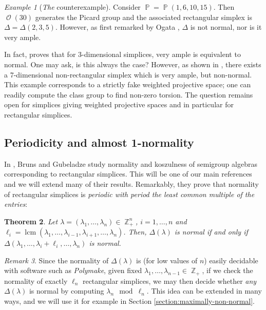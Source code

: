 \documentclass[a4paper,11pt]{amsart}
\theoremstyle{plain}
\newtheorem{theorem}{Theorem}[section]
\theoremstyle{definition}
\theoremstyle{remark}
\newtheorem{example}[theorem]{Example}
\newtheorem{remark}[theorem]{Remark}
\DeclareMathOperator{\ZZ}{\mathbb{Z}}
\DeclareMathOperator{\PP}{\mathbb{P}}
\DeclareMathOperator{\cO}{\mathcal{O}}
\DeclareMathOperator{\lcm}{lcm}
\begin{document}
\begin{example}[\emph{The} counterexample]\label{example:Ogata-counterexample}
Consider $\PP = \PP(1,6,10,15)$.
Then $\cO(30)$ generates the Picard group and the associated rectangular simplex is $\Delta = \Delta(2,3,5)$.
However, as first remarked by Ogata \cite{Ogata:2005}, $\Delta$ is not normal, nor is it very ample.
\end{example}

In fact, \cite{Ogata:2005} proves that for 3-dimensional simplices, very ample is equivalent to normal.
One may ask, is this always the case?
However, as shown in \cite[Example 2.3]{CoxHasseHibiHigashitani:2014}, there exists a 7-dimensional non-rectangular simplex which is very ample, but non-normal.
This example corresponds to a strictly fake weighted projective space; one can readily compute the class group to find non-zero torsion.
The question remains open for simplices giving weighted projective spaces and in particular for rectangular simplices.

\subsection{Periodicity and almost 1-normality} \hfill

In \cite{BrunsGubeladze:1999}, Bruns and Gubeladze study normality and koszulness of semigroup algebras corresponding to rectangular simplices. This will be one of our main references and we will extend many of their results. Remarkably, they prove that normality of rectangular simplices is \emph{periodic with period the least common multiple of the entries}:

\begin{theorem}\label{theorem:periodicity}\cite[Theorem 1.6]{BrunsGubeladze:1999}
    Let $\lambda = (\lambda_1, \ldots, \lambda_n) \in \ZZ_+^n$, $i = 1, \ldots, n$ and $\ell_i = \lcm(\lambda_1, \ldots, \lambda_{i - 1}, \lambda_{i + 1}, \ldots, \lambda_n)$. Then, $\Delta(\lambda)$ is normal if and only if $\Delta(\lambda_1, \ldots, \lambda_i + \ell_i, \ldots, \lambda_n)$ is normal.
\end{theorem}

\begin{remark}
    Since the normality of $\Delta(\lambda)$ is (for low values of $n$) easily decidable with software such as \emph{Polymake}, given fixed $\lambda_1, \ldots, \lambda_{n - 1} \in \ZZ_+$, if we check the normality of exactly $\ell_n$ rectangular simplices, we may then decide whether \emph{any} $\Delta(\lambda)$ is normal by computing $\lambda_n \mod \ell_n$. This idea can be extended in many ways, and we will use it for example in Section \ref{section:maximally-non-normal}.
\end{remark}
\end{document}
